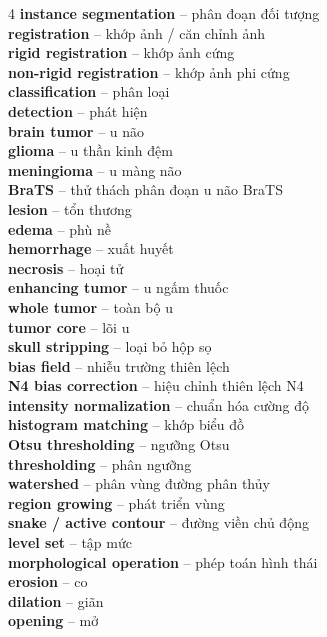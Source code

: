 \begin{multicols}{4}
\textbf{instance segmentation} -- phân đoạn đối tượng\\
\textbf{registration} -- khớp ảnh / căn chỉnh ảnh\\
\textbf{rigid registration} -- khớp ảnh cứng\\
\textbf{non-rigid registration} -- khớp ảnh phi cứng\\
\textbf{classification} -- phân loại\\
\textbf{detection} -- phát hiện\\
\textbf{brain tumor} -- u não\\
\textbf{glioma} -- u thần kinh đệm\\
\textbf{meningioma} -- u màng não\\
\textbf{BraTS} -- thử thách phân đoạn u não BraTS\\
\textbf{lesion} -- tổn thương\\
\textbf{edema} -- phù nề\\
\textbf{hemorrhage} -- xuất huyết\\
\textbf{necrosis} -- hoại tử\\
\textbf{enhancing tumor} -- u ngấm thuốc\\
\textbf{whole tumor} -- toàn bộ u\\
\textbf{tumor core} -- lõi u\\
\textbf{skull stripping} -- loại bỏ hộp sọ\\
\textbf{bias field} -- nhiễu trường thiên lệch\\
\textbf{N4 bias correction} -- hiệu chỉnh thiên lệch N4\\
\textbf{intensity normalization} -- chuẩn hóa cường độ\\
\textbf{histogram matching} -- khớp biểu đồ\\
\textbf{Otsu thresholding} -- ngưỡng Otsu\\
\textbf{thresholding} -- phân ngưỡng\\
\textbf{watershed} -- phân vùng đường phân thủy\\
\textbf{region growing} -- phát triển vùng\\
\textbf{snake / active contour} -- đường viền chủ động\\
\textbf{level set} -- tập mức\\
\textbf{morphological operation} -- phép toán hình thái\\
\textbf{erosion} -- co\\
\textbf{dilation} -- giãn\\
\textbf{opening} -- mở\\

\end{multicols}

